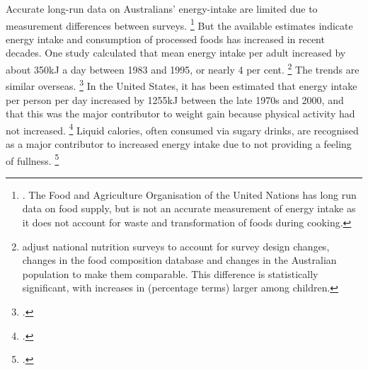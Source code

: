 \documentclass[embargoed]{grattan}
\begin{document}
Accurate long-run data on Australians' energy-intake are limited due to measurement differences between surveys.%
\footnote{\textcites{Health2012Australiasfood}{Bleich2007Whyisdeveloped}.
The Food and Agriculture Organisation of the United Nations has long run data on food supply, but is not an accurate measurement of energy intake as it does not account for waste and transformation of foods during cooking.} But the available estimates indicate energy intake and consumption of processed foods has increased in recent decades.
One study calculated that mean energy intake per adult increased by about 350kJ a day between 1983 and 1995, or nearly 4 per cent.%
\footnote{\textcite{Cook2001Comparabledatafood} adjust national nutrition surveys to account for survey design changes, changes in the food composition database and changes in the Australian population to make them comparable.
This difference is statistically significant, with increases in (percentage terms) larger among children.} The trends are similar overseas.%
\footcites{Cavadini2000USadolescentfood}{Nielsen2002Trendsenergyintake}{Bleich2007Whyisdeveloped} In the United States, it has been estimated that energy intake per person per day increased by 1255kJ between the late 1970s and 2000, and that this was the major contributor to weight gain because physical activity had not increased.%
\footcite{Woodward-Lopez2010whatextenthave} Liquid calories, often consumed via sugary drinks, are recognised as a major contributor to increased energy intake due to not providing a feeling of fullness.%
\footcites{Woodward-Lopez2010whatextenthave}{Johnson2009Dietarysugarsintake}
\end{document}
